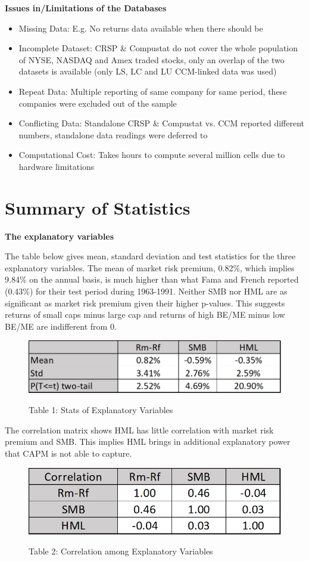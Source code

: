 \documentclass[12pt]{article}
\begin{document}
\noindent \textbf{Issues in/Limitations of the Databases}
\begin{itemize}
	\item Missing Data: E.g. No returns data available when there should be
	\item Incomplete Dataset: CRSP \& Compustat do not cover the whole population of NYSE, NASDAQ and Amex traded stocks, only an overlap of the two datasets is available (only LS, LC and LU CCM-linked data was used)
	\item Repeat Data: Multiple reporting of same company for same period, these companies were excluded out of the sample
	\item Conflicting Data: Standalone CRSP \& Compustat vs. CCM reported different numbers, standalone data readings were deferred to
	\item Computational Cost: Takes hours to compute several million cells due to hardware limitations
\end{itemize}
\section{Summary of Statistics}
\textbf{The explanatory variables}

\noindent The table below gives mean, standard deviation and test statistics for the three explanatory variables. The mean of market risk premium, 0.82\%, which implies 9.84\% on the annual basis, is much higher than what Fama and French reported (0.43\%) for their test period during 1963-1991. Neither SMB nor HML are as significant as market risk premium given their higher p-values. This suggests returns of small caps minus large cap and returns of high BE/ME minus low BE/ME are indifferent from 0.


\begin{figure}[h]
	\centering
	\caption*{Table 1: Stats of Explanatory Variables}
	\includegraphics[width=0.5\linewidth]{A1.png}
	\label{fig:label}
\end{figure}


\noindent The correlation matrix shows HML has little correlation with market risk premium and SMB. This implies HML brings in additional explanatory power that CAPM is not able to capture.

\begin{figure}[h]
	\centering
	\caption*{Table 2: Correlation among Explanatory Variables}
	\includegraphics[width=0.35\linewidth]{A2.png}
	\label{fig:label}
\end{figure}
\end{document}
